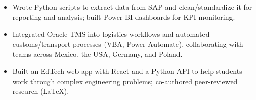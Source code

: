 \begin{itemize}
  \item Wrote Python scripts to extract data from SAP and clean/standardize it for
        reporting and analysis; built Power BI dashboards for KPI monitoring.
  \item Integrated Oracle TMS into logistics workflows and automated customs/transport
        processes (VBA, Power Automate), collaborating with teams across Mexico, the USA,
        Germany, and Poland.
\end{itemize}
\vspace{4pt}

\begin{itemize}
  \item Built an EdTech web app with React and a Python API to help students work
        through complex engineering problems; co-authored peer-reviewed research (LaTeX).
\end{itemize}
